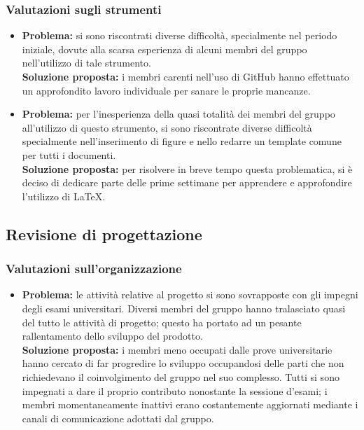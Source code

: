 \subsubsection{Valutazioni sugli strumenti}
\begin{itemize}
	\item \textbf{Problema:} si sono riscontrati diverse difficoltà, specialmente nel periodo iniziale, dovute alla scarsa esperienza di alcuni membri del gruppo nell'utilizzo di tale strumento.\\
	\textbf{Soluzione proposta:} i membri carenti nell'uso di GitHub hanno effettuato un approfondito lavoro individuale per sanare le proprie mancanze.
\end{itemize}
\myparagraph{\LaTeX}
\begin{itemize}
	\item \textbf{Problema:} per l’inesperienza della quasi totalità dei membri del gruppo all'utilizzo di questo strumento, si sono riscontrate diverse difficoltà specialmente nell'inserimento di figure e nello redarre un template comune per tutti i documenti.\\
	\textbf{Soluzione proposta:} per risolvere in breve tempo questa problematica, si è deciso di dedicare parte delle prime settimane per apprendere e approfondire l’utilizzo di \LaTeX.
\end{itemize}
\subsection{Revisione di progettazione}
\subsubsection{Valutazioni sull'organizzazione}
\begin{itemize}
	\item \textbf{Problema:} le attività relative al progetto si sono sovrapposte con gli impegni degli esami universitari. Diversi membri del gruppo hanno tralasciato quasi del tutto le attività di progetto; questo ha portato ad un pesante rallentamento dello sviluppo del prodotto.\\
	\textbf{Soluzione proposta:} i membri meno occupati dalle prove universitarie hanno cercato di far progredire lo sviluppo occupandosi delle parti che non richiedevano il coinvolgimento del gruppo nel suo complesso. Tutti si sono impegnati a dare il proprio contributo nonostante la sessione d'esami; i membri momentaneamente inattivi erano costantemente aggiornati mediante i canali di comunicazione adottati dal gruppo.
\end{itemize}
